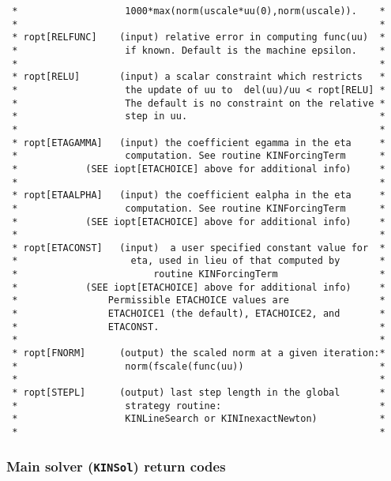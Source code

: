 \documentclass[11pt]{article}
\begin{document}
\begin{verbatim}
 *                   1000*max(norm(uscale*uu(0),norm(uscale)).    *
 *                                                                *
 * ropt[RELFUNC]    (input) relative error in computing func(uu)  *
 *                   if known. Default is the machine epsilon.    *
 *                                                                *
 * ropt[RELU]       (input) a scalar constraint which restricts   *
 *                   the update of uu to  del(uu)/uu < ropt[RELU] *
 *                   The default is no constraint on the relative *
 *                   step in uu.                                  *
 *                                                                *
 * ropt[ETAGAMMA]   (input) the coefficient egamma in the eta     *
 *                   computation. See routine KINForcingTerm      *
 *            (SEE iopt[ETACHOICE] above for additional info)     *
 *                                                                *
 * ropt[ETAALPHA]   (input) the coefficient ealpha in the eta     *
 *                   computation. See routine KINForcingTerm      *
 *            (SEE iopt[ETACHOICE] above for additional info)     *
 *                                                                *
 * ropt[ETACONST]   (input)  a user specified constant value for  *
 *                    eta, used in lieu of that computed by       *
 *                        routine KINForcingTerm                  *
 *            (SEE iopt[ETACHOICE] above for additional info)     *
 *                Permissible ETACHOICE values are                *
 *                ETACHOICE1 (the default), ETACHOICE2, and       *
 *                ETACONST.                                       *
 *                                                                *
 * ropt[FNORM]      (output) the scaled norm at a given iteration:*
 *                   norm(fscale(func(uu))                        *
 *                                                                *
 * ropt[STEPL]      (output) last step length in the global       *
 *                   strategy routine:                            *
 *                   KINLineSearch or KINInexactNewton)           *
 *                                                                *

\end{verbatim}
\normalsize

\subsubsection{Main solver ({\tt KINSol}) return codes}
\end{document}
